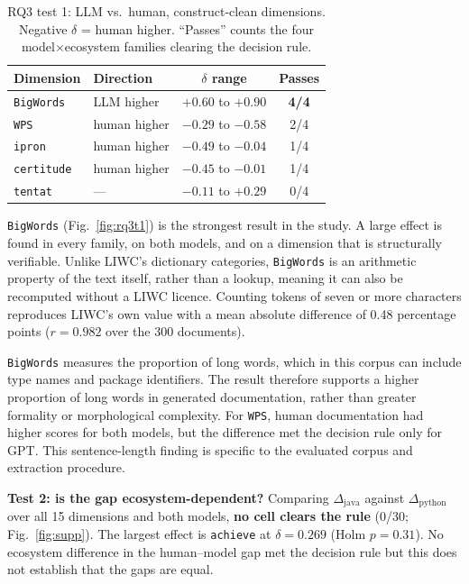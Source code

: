 \documentclass[conference]{IEEEtran}
\begin{document}
\begin{table}[htbp]
\caption{RQ3 test 1: LLM vs.\ human, construct-clean dimensions.
Negative $\delta$ = human higher. ``Passes'' counts the four
model$\times$ecosystem families clearing the decision rule.}
\label{tbl:rq3t1}
\begin{center}
\begin{tabular}{llcc}
\toprule
\textbf{Dimension} & \textbf{Direction} & \textbf{$\delta$ range} & \textbf{Passes} \\
\midrule
\texttt{BigWords}  & LLM higher    & $+0.60$ to $+0.90$ & \textbf{4/4} \\
\texttt{WPS}       & human higher  & $-0.29$ to $-0.58$ & 2/4 \\
\texttt{ipron}     & human higher  & $-0.49$ to $-0.04$ & 1/4 \\
\texttt{certitude} & human higher  & $-0.45$ to $-0.01$ & 1/4 \\
\texttt{tentat}    & ---           & $-0.11$ to $+0.29$ & 0/4 \\
\bottomrule
\end{tabular}
\end{center}
\end{table}

\texttt{BigWords} (Fig.~\ref{fig:rq3t1}) is the strongest result in the study. A large effect is found in every family, on both models, and on a dimension that is structurally verifiable. Unlike LIWC's dictionary categories, \texttt{BigWords} is an arithmetic property of the text itself, rather than a lookup, meaning it can also be recomputed without a LIWC licence. Counting tokens of seven or more characters reproduces LIWC's own value with a mean absolute difference of 0.48 percentage points ($r = 0.982$ over the 300 documents).

\texttt{BigWords} measures the proportion of long words, which in this corpus can include type names and package identifiers. The result therefore supports a higher proportion of long words in generated documentation, rather than greater formality or morphological complexity. For \texttt{WPS}, human documentation had higher scores for both models, but the difference met the decision rule only for GPT. This sentence-length finding is specific to the evaluated corpus and extraction procedure.

\textbf{Test 2: is the gap ecosystem-dependent?} Comparing $\Delta_{\text{java}}$ against $\Delta_{\text{python}}$ over all 15 dimensions and both models, \textbf{no cell clears the rule} (0/30; Fig.~\ref{fig:supp}). The largest effect is \texttt{achieve} at $\delta = 0.269$ (Holm
$p = 0.31$). No ecosystem difference in the human--model gap met the decision rule but this does not establish that the gaps are equal.
\end{document}
